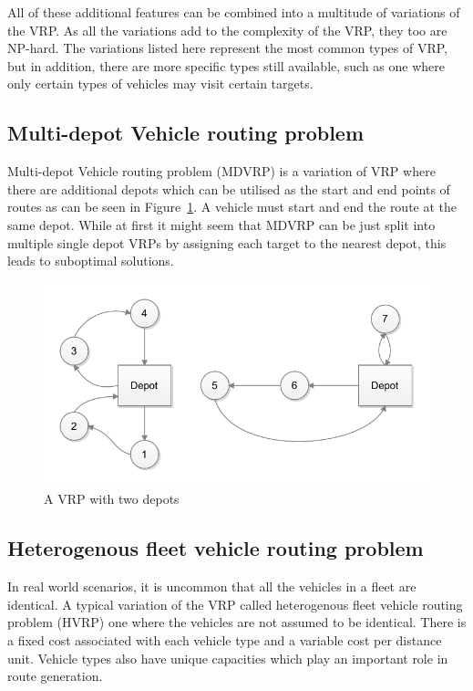All of these additional features can be combined into a multitude of variations of the VRP. As all the variations add to the complexity of the VRP, they too are NP-hard. The variations listed here represent the most common types of VRP, but in addition, there are more specific types still available, such as one where only certain types of vehicles may visit certain targets. \cite{montoya2015literature} 


\subsection{Multi-depot Vehicle routing problem}

Multi-depot Vehicle routing problem (MDVRP) is a variation of VRP where there are additional depots which can be utilised as the start and end points of routes as can be seen in Figure~\ref{fig:multidepot}. A vehicle must start and end the route at the same depot. While at first it might seem that MDVRP can be just split into multiple single depot VRPs by assigning each target to the nearest depot, this leads to suboptimal solutions. \cite{salhi2014multi}

\begin{figure}[h]
  \begin{center}
    \includegraphics{images/multidepot.pdf}
    \caption{A VRP with two depots}
    \label{fig:multidepot}
  \end{center}
\end{figure}

\subsection{Heterogenous fleet vehicle routing problem}

In real world scenarios, it is uncommon that all the vehicles in a fleet are identical. A typical variation of the VRP called heterogenous fleet vehicle routing problem (HVRP) one where the vehicles are not assumed to be identical. There is a fixed cost associated with each vehicle type and a variable cost per distance unit. Vehicle types also have unique capacities which play an important role in route generation. \cite{gendreau1999tabu}


